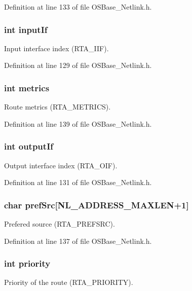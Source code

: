 Definition at line 133 of file OSBase\_\-Netlink.h.\hypertarget{structnl_route_info_a65bea094a4f4aef320764f97df3c51d7}{
\subsubsection[{inputIf}]{\setlength{\rightskip}{0pt plus 5cm}int {\bf inputIf}}}
\label{structnl_route_info_a65bea094a4f4aef320764f97df3c51d7}
Input interface index (RTA\_\-IIF). 

Definition at line 129 of file OSBase\_\-Netlink.h.\hypertarget{structnl_route_info_afcee26a6d6f42393d37dd68d5562d062}{
\subsubsection[{metrics}]{\setlength{\rightskip}{0pt plus 5cm}int {\bf metrics}}}
\label{structnl_route_info_afcee26a6d6f42393d37dd68d5562d062}
Route metrics (RTA\_\-METRICS). 

Definition at line 139 of file OSBase\_\-Netlink.h.\hypertarget{structnl_route_info_ae0ce7856052fdb9a226716db04dba402}{
\subsubsection[{outputIf}]{\setlength{\rightskip}{0pt plus 5cm}int {\bf outputIf}}}
\label{structnl_route_info_ae0ce7856052fdb9a226716db04dba402}
Output interface index (RTA\_\-OIF). 

Definition at line 131 of file OSBase\_\-Netlink.h.\hypertarget{structnl_route_info_a1d8287d8eec6924f2c8d056cd1115b7f}{
\subsubsection[{prefSrc}]{\setlength{\rightskip}{0pt plus 5cm}char {\bf prefSrc}\mbox{[}NL\_\-ADDRESS\_\-MAXLEN+1\mbox{]}}}
\label{structnl_route_info_a1d8287d8eec6924f2c8d056cd1115b7f}
Prefered source (RTA\_\-PREFSRC). 

Definition at line 137 of file OSBase\_\-Netlink.h.\hypertarget{structnl_route_info_acec9ce2df15222151ad66fcb1d74eb9f}{
\subsubsection[{priority}]{\setlength{\rightskip}{0pt plus 5cm}int {\bf priority}}}
\label{structnl_route_info_acec9ce2df15222151ad66fcb1d74eb9f}
Priority of the route (RTA\_\-PRIORITY). 

